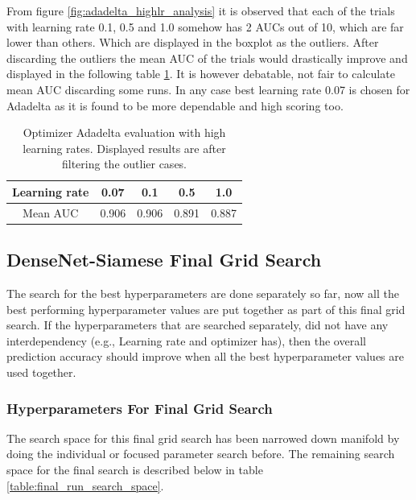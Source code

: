 \flushbottom
\newpage
From figure \ref{fig:adadelta_highlr_analysis} it is observed that each of the trials with learning rate 0.1, 0.5 and 
1.0 somehow has 2 AUCs out of 10, which are far lower than others. Which are displayed in the boxplot as the outliers. After discarding the outliers the mean AUC of the trials would drastically improve and displayed in the following table 
\ref{table:adadelta_high_lr}. It is however debatable, not fair to calculate mean AUC discarding some runs. In any case best learning rate 0.07 is chosen for Adadelta as it is found to be more dependable and high scoring too.

\begin{table}[ht]
 \centering
 \caption{Optimizer Adadelta evaluation with high learning rates. Displayed results are after filtering the outlier cases.}
 \begin{tabular}{|c c c c c|} 
 \hline\hline
 \rowcolor{lightgrey}
 Learning rate & 0.07 & 0.1 & 0.5 & 1.0 \\ [0.5ex] 
 \hline
 Mean AUC & 0.906 & 0.906 & 0.891 & 0.887 \\ 
 \hline \hline
\end{tabular}
\label{table:adadelta_high_lr}
\end{table}


\subsection{DenseNet-Siamese Final Grid Search}
The search for the best hyperparameters are done separately so far, now all the best performing hyperparameter values are put together as part of this final grid search. If the hyperparameters that are searched separately, did 
not have any interdependency (e.g., Learning rate and optimizer has), then the overall prediction accuracy should improve when all the best hyperparameter values are used together. 

\subsubsection{Hyperparameters For Final Grid Search}
The search space for this final grid search has been narrowed 
down manifold by doing the individual or focused parameter search before. The remaining search space for the final search is described below in table \ref{table:final_run_search_space}.

